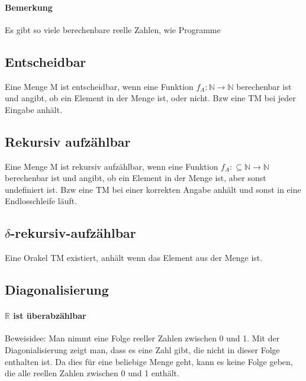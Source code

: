\documentclass[ngerman]{scrartcl}
\begin{document}
\paragraph{Bemerkung} Es gibt so viele berechenbare reelle Zahlen, wie Programme

\subsection{Entscheidbar}
Eine Menge M ist entscheidbar, wenn eine Funktion $ f_A : \mathbb{N} \rightarrow \mathbb{N} $ berechenbar ist und angibt, ob ein Element in der Menge ist, oder nicht. Bzw eine TM bei jeder Eingabe anhält.

\subsection{Rekursiv aufzählbar}
Eine Menge M ist rekursiv aufzählbar, wenn eine Funktion $ f_A : \subseteq \mathbb{N} \rightarrow \mathbb{N} $ berechenbar ist und angibt, ob ein Element in der Menge ist, aber sonst undefiniert ist. Bzw eine TM bei einer korrekten Angabe anhält und sonst in eine Endlosschleife läuft.

\subsection{$ \delta $-rekursiv-aufzählbar} Eine Orakel TM existiert, anhält wenn das Element aus der Menge ist.

\subsection{Diagonalisierung}
\paragraph{$ \mathbb{R} $ ist überabzählbar}

Beweisidee: Man nimmt eine Folge reeller Zahlen zwischen 0 und 1. Mit der Diagonialisierung zeigt man, dass es eine Zahl gibt, die nicht in dieser Folge enthalten ist. Da dies für eine beliebige Menge geht, kann es keine Folge geben, die alle reellen Zahlen zwischen 0 und 1 enthält.

\end{document}
